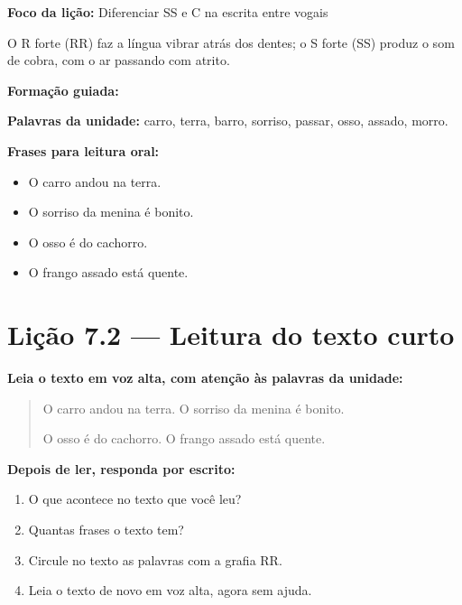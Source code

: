 \textbf{Foco da lição:} Diferenciar SS e C na escrita entre vogais


\begin{boquinha}
O R forte (RR) faz a língua vibrar atrás dos dentes; o S forte (SS) produz o som de cobra, com o ar passando com atrito.
\end{boquinha}

\noindent\textbf{Formação guiada:}

\begin{center}
\end{center}

\noindent\textbf{Palavras da unidade:} carro, terra, barro, sorriso, passar, osso, assado, morro.

\noindent\textbf{Frases para leitura oral:}
\begin{itemize}[leftmargin=1.6em]
  \item O carro andou na terra.
  \item O sorriso da menina é bonito.
  \item O osso é do cachorro.
  \item O frango assado está quente.
\end{itemize}

\section{Lição 7.2 --- Leitura do texto curto}

\noindent\textbf{Leia o texto em voz alta, com atenção às palavras da unidade:}


\begin{quote}
O carro andou na terra. O sorriso da menina é bonito.

O osso é do cachorro. O frango assado está quente.
\end{quote}

\textbf{Depois de ler, responda por escrito:}
\begin{enumerate}

  \item O que acontece no texto que você leu?
  \begin{center}
  \underline{\hspace{12cm}}
  \end{center}

  \item Quantas frases o texto tem?
  \begin{center}
  \underline{\hspace{12cm}}
  \end{center}

  \item Circule no texto as palavras com a grafia RR.

  \item Leia o texto de novo em voz alta, agora sem ajuda.

\end{enumerate}

